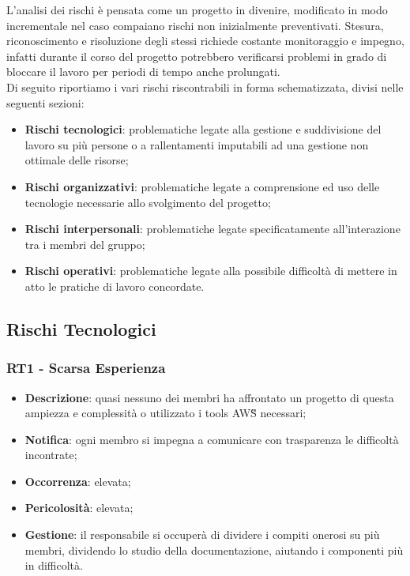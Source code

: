 L'analisi dei rischi è pensata come un progetto in divenire, modificato in modo incrementale nel caso compaiano rischi non inizialmente preventivati. Stesura, riconoscimento e risoluzione degli stessi richiede costante monitoraggio e impegno, infatti durante il corso del progetto potrebbero verificarsi problemi in grado di bloccare il lavoro per periodi di tempo anche prolungati. \\
 Di seguito riportiamo i vari rischi riscontrabili in forma schematizzata, divisi nelle seguenti sezioni:
\begin{itemize}
   \item \textbf{Rischi tecnologici}: problematiche legate alla gestione e suddivisione del lavoro su più persone o a rallentamenti imputabili ad una gestione non ottimale delle risorse;
   \item \textbf{Rischi organizzativi}: problematiche legate a comprensione ed uso delle tecnologie necessarie allo svolgimento del progetto;
   \item \textbf{Rischi interpersonali}: problematiche legate specificatamente all'interazione tra i membri del gruppo;
   \item \textbf{Rischi operativi}: problematiche legate alla possibile difficoltà di mettere in atto le pratiche di lavoro concordate.
\end{itemize}

   \subsection{Rischi Tecnologici}
   
   \subsubsection*{RT1 - Scarsa Esperienza}
   \begin{itemize}
   	\item \textbf{Descrizione}: quasi nessuno dei membri ha affrontato un progetto di questa ampiezza e complessità o utilizzato i tools AWS\G{} necessari;
   	\item \textbf{Notifica}: ogni membro si impegna a comunicare con trasparenza le difficoltà incontrate;
   	\item \textbf{Occorrenza}: elevata;
   	\item \textbf{Pericolosità}: elevata;
   	\item \textbf{Gestione}: il responsabile si occuperà di dividere i compiti onerosi su più membri, dividendo lo studio della documentazione, aiutando i componenti più in difficoltà.
   \end{itemize}

